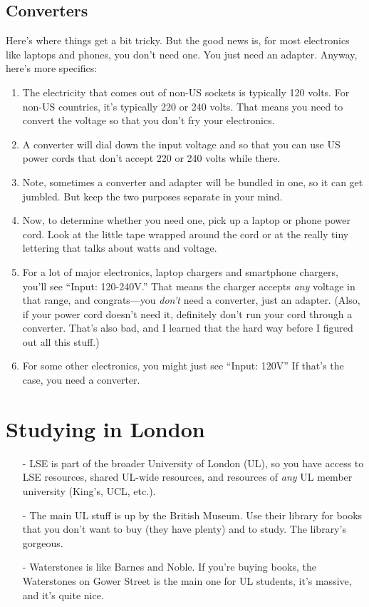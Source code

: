 \documentclass[a4paper,12pt]{scrartcl}
\begin{document}
\subsection{Converters} Here's where things get a bit tricky. But
the good news is, for most electronics like laptops and phones, you
don't need one. You just need an adapter. Anyway, here's more
specifics:
\begin{enumerate}
   \item The electricity that comes out of non-US sockets is typically 
      120 volts. For non-US countries, it's typically 220 or 240 volts.
      That means you need to convert the voltage so that you don't
      fry your electronics.
   \item A converter will dial down the input voltage and so that
      you can use US power cords that don't accept
      220 or 240 volts while there.
   \item Note, sometimes a converter and adapter will be bundled
      in one, so it can get jumbled. But keep the two 
      purposes separate in your mind.
   \item Now, to determine whether you need one, pick up a laptop
      or phone power cord. Look at the little tape wrapped around
      the cord or at the really tiny lettering that talks about
      watts and voltage.
   \item For a lot of major electronics, laptop chargers and smartphone
      chargers, you'll see ``Input: 120-240V.'' That means the charger
      accepts \emph{any} voltage in that range, and congrats---you
      \emph{don't} need a converter, just an adapter. (Also, if 
      your power cord doesn't need it, 
      definitely don't run your cord through a converter. That's 
      also bad, and I learned that
      the hard way before I figured out all this stuff.)
   \item For some other electronics, you might just see ``Input: 120V''
      If that's the case, you need a converter.
\end{enumerate}



     
\newpage
\section{Studying in London}

\begin{itemize}
   \item[-] 
      LSE is part of the broader University of London (UL), so you have
	  access to LSE resources, shared UL-wide resources, and
	  resources of \emph{any} UL member university (King's, UCL,
	  etc.).
   \item[-] The main UL stuff is up by the British Museum. Use their 
	  library for books that you don't want to buy (they have
	  plenty) and to study. The library's gorgeous.
   \item[-]
      Waterstones is like Barnes and Noble. If you're buying books,
	  the Waterstones on Gower Street is the main one for UL 
	  students, it's massive, and it's quite nice.
\end{itemize}






% 
\end{document}
